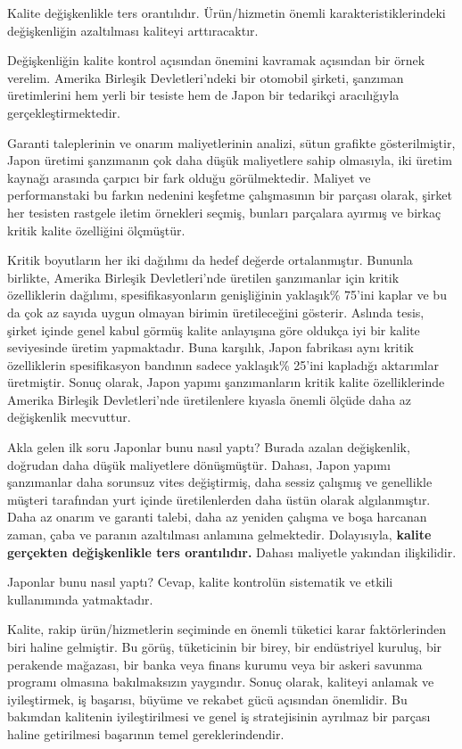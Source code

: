 \documentclass[
]{book}
\begin{document}
Kalite değişkenlikle ters orantılıdır. Ürün/hizmetin önemli karakteristiklerindeki değişkenliğin azaltılması kaliteyi arttıracaktır.

Değişkenliğin kalite kontrol açısından önemini kavramak açısından bir örnek verelim. Amerika Birleşik Devletleri'ndeki bir otomobil şirketi, şanzıman üretimlerini hem yerli bir tesiste hem de Japon bir tedarikçi aracılığıyla gerçekleştirmektedir.

Garanti taleplerinin ve onarım maliyetlerinin analizi, sütun grafikte gösterilmiştir, Japon üretimi şanzımanın çok daha düşük maliyetlere sahip olmasıyla, iki üretim kaynağı arasında çarpıcı bir fark olduğu görülmektedir. Maliyet ve performanstaki bu farkın nedenini keşfetme çalışmasının bir parçası olarak, şirket her tesisten rastgele iletim örnekleri seçmiş, bunları parçalara ayırmış ve birkaç kritik kalite özelliğini ölçmüştür.

Kritik boyutların her iki dağılımı da hedef değerde ortalanmıştır. Bununla birlikte, Amerika Birleşik Devletleri'nde üretilen şanzımanlar için kritik özelliklerin dağılımı, spesifikasyonların genişliğinin yaklaşık\% 75'ini kaplar ve bu da çok az sayıda uygun olmayan birimin üretileceğini gösterir. Aslında tesis, şirket içinde genel kabul görmüş kalite anlayışına göre oldukça iyi bir kalite seviyesinde üretim yapmaktadır. Buna karşılık, Japon fabrikası aynı kritik özelliklerin spesifikasyon bandının sadece yaklaşık\% 25'ini kapladığı aktarımlar üretmiştir. Sonuç olarak, Japon yapımı şanzımanların kritik kalite özelliklerinde Amerika Birleşik Devletleri'nde üretilenlere kıyasla önemli ölçüde daha az değişkenlik mecvuttur.

Akla gelen ilk soru Japonlar bunu nasıl yaptı? Burada azalan değişkenlik, doğrudan daha düşük maliyetlere dönüşmüştür. Dahası, Japon yapımı şanzımanlar daha sorunsuz vites değiştirmiş, daha sessiz çalışmış ve genellikle müşteri tarafından yurt içinde üretilenlerden daha üstün olarak algılanmıştır. Daha az onarım ve garanti talebi, daha az yeniden çalışma ve boşa harcanan zaman, çaba ve paranın azaltılması anlamına gelmektedir. Dolayısıyla, \textbf{kalite gerçekten değişkenlikle ters orantılıdır.} Dahası maliyetle yakından ilişkilidir.

Japonlar bunu nasıl yaptı? Cevap, kalite kontrolün sistematik ve etkili kullanımında yatmaktadır.

Kalite, rakip ürün/hizmetlerin seçiminde en önemli tüketici karar faktörlerinden biri haline gelmiştir. Bu görüş, tüketicinin bir birey, bir endüstriyel kuruluş, bir perakende mağazası, bir banka veya finans kurumu veya bir askeri savunma programı olmasına bakılmaksızın yaygındır. Sonuç olarak, kaliteyi anlamak ve iyileştirmek, iş başarısı, büyüme ve rekabet gücü açısından önemlidir. Bu bakımdan kalitenin iyileştirilmesi ve genel iş stratejisinin ayrılmaz bir parçası haline getirilmesi başarının temel gereklerindendir.
\end{document}
